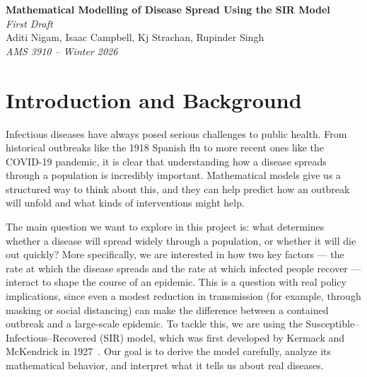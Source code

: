 \documentclass[11pt]{article}
\begin{document}
\begin{center}
    {\Large\bfseries Mathematical Modelling of Disease Spread Using the SIR Model}\\[4pt]
    {\normalsize\itshape First Draft}\\[3pt]
    {\normalsize Aditi Nigam, Isaac Campbell, Kj Strachan, Rupinder Singh}\\[2pt]
    {\normalsize\itshape AMS 3910 -- Winter 2026}
\end{center}

\vspace{4pt}

\section{Introduction and Background}

Infectious diseases have always posed serious challenges to public health. From historical outbreaks like the 1918 Spanish flu to more recent ones like the COVID-19 pandemic, it is clear that understanding how a disease spreads through a population is incredibly important. Mathematical models give us a structured way to think about this, and they can help predict how an outbreak will unfold and what kinds of interventions might help.

The main question we want to explore in this project is: what determines whether a disease will spread widely through a population, or whether it will die out quickly? More specifically, we are interested in how two key factors --- the rate at which the disease spreads and the rate at which infected people recover --- interact to shape the course of an epidemic. This is a question with real policy implications, since even a modest reduction in transmission (for example, through masking or social distancing) can make the difference between a contained outbreak and a large-scale epidemic. To tackle this, we are using the Susceptible--Infectious--Recovered (SIR) model, which was first developed by Kermack and McKendrick in 1927~\cite{kermack1927}. Our goal is to derive the model carefully, analyze its mathematical behavior, and interpret what it tells us about real diseases.

\end{document}
